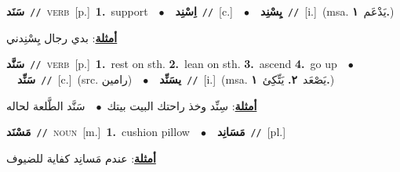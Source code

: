 \documentclass[10pt,a4paper,twoside]{article} %
\begin{document}
\begin{multicols}{2}
{\setlength\topsep{0pt}\textbf{\foreignlanguage{arabic}{سَنَد}}\ {\color{gray}\texttt{//}\color{black}}\ \textsc{verb}\ [p.]\ \textbf{1.}~support\ \ $\bullet$\ \ \setlength\topsep{0pt}\textbf{\foreignlanguage{arabic}{اِسْنِد}}\ {\color{gray}\texttt{//}\color{black}}\ [c.]\ \ $\bullet$\ \ \setlength\topsep{0pt}\textbf{\foreignlanguage{arabic}{يِسْنِد}}\ {\color{gray}\texttt{//}\color{black}}\ [i.]\ \color{gray}(msa. \foreignlanguage{arabic}{يَدْعَم}~\foreignlanguage{arabic}{\textbf{١.}})\color{black}\  \begin{flushright}\color{gray}\foreignlanguage{arabic}{\textbf{\underline{\foreignlanguage{arabic}{أمثلة}}}: بدي رجال يِسْنِدني}\end{flushright}\color{black}} \vspace{2mm}

{\setlength\topsep{0pt}\textbf{\foreignlanguage{arabic}{سَنَّد}}\ {\color{gray}\texttt{//}\color{black}}\ \textsc{verb}\ [p.]\ \textbf{1.}~rest on sth.  \textbf{2.}~lean on sth.  \textbf{3.}~ascend  \textbf{4.}~go up\ \ $\bullet$\ \ \setlength\topsep{0pt}\textbf{\foreignlanguage{arabic}{سَنِّد}}\ {\color{gray}\texttt{//}\color{black}}\ [c.]\ (src. \color{gray}\foreignlanguage{arabic}{رامين}\color{black})\ \ $\bullet$\ \ \setlength\topsep{0pt}\textbf{\foreignlanguage{arabic}{يسَنِّد}}\ {\color{gray}\texttt{//}\color{black}}\ [i.]\ \color{gray}(msa. \foreignlanguage{arabic}{يَصْعَد}~\foreignlanguage{arabic}{\textbf{٢.}}  \foreignlanguage{arabic}{يَتِّكِئ}~\foreignlanguage{arabic}{\textbf{١.}})\color{black}\  \begin{flushright}\color{gray}\foreignlanguage{arabic}{\textbf{\underline{\foreignlanguage{arabic}{أمثلة}}}: سِنِّد وخذ راحتك البيت بيتك\ $\bullet$\ \  سَنَّد الطَّلعة لحاله}\end{flushright}\color{black}} \vspace{2mm}

{\setlength\topsep{0pt}\textbf{\foreignlanguage{arabic}{مَسْنَد}}\ {\color{gray}\texttt{//}\color{black}}\ \textsc{noun}\ [m.]\ \textbf{1.}~cushion pillow\ \ $\bullet$\ \ \setlength\topsep{0pt}\textbf{\foreignlanguage{arabic}{مَسَانِد}}\ {\color{gray}\texttt{//}\color{black}}\ [pl.]\  \begin{flushright}\color{gray}\foreignlanguage{arabic}{\textbf{\underline{\foreignlanguage{arabic}{أمثلة}}}: عندم مَسانِد كفاية للضيوف}\end{flushright}\color{black}} \vspace{2mm}


\end{multicols}
\end{document}
